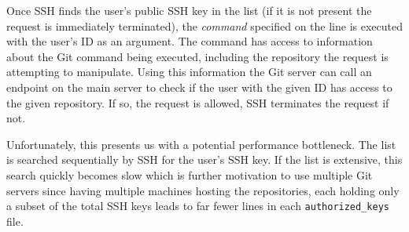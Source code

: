 Once SSH finds the user's public SSH key in the list (if it is not present the request is immediately terminated), the \emph{command} specified on the line is executed with the user's ID as an argument. The command has access to information about the Git command being executed, including the repository the request is attempting to manipulate. Using this information the Git server can call an endpoint on the main server to check if the user with the given ID has access to the given repository. If so, the request is allowed, SSH terminates the request if not.

Unfortunately, this presents us with a potential performance bottleneck. The list is searched sequentially by SSH for the user's SSH key. If the list is extensive, this search quickly becomes slow which is further motivation to use multiple Git servers since having multiple machines hosting the repositories, each holding only a subset of the total SSH keys leads to far fewer lines in each \texttt{authorized\_keys} file. 